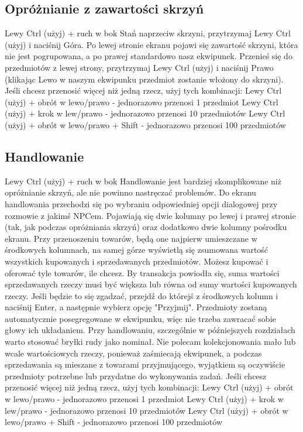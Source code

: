 \documentclass[11pt,polish, openany]{book}
\begin{document}
\subsection{Opróżnianie z zawartości skrzyń}
Lewy Ctrl (użyj) + ruch w bok
Stań naprzeciw skrzyni, przytrzymaj Lewy Ctrl (użyj) i naciśnij Góra. Po lewej stronie ekranu pojawi się zawartość skrzyni, która nie jest pogrupowana, a po prawej standardowo nasz ekwipunek. Przenieś się do przedmiotów z lewej strony, przytrzymaj Lewy Ctrl (użyj) i naciśnij Prawo (klikając Lewo w naszym ekwipunku przedmiot zostanie włożony do skrzyni).
Jeśli chcesz przenosić więcej niż jedną rzecz, użyj tych kombinacji:
Lewy Ctrl (użyj) + obrót w lewo/prawo - jednorazowo przenosi 1 przedmiot
Lewy Ctrl (użyj) + krok w lew/prawo - jednorazowo przenosi 10 przedmiotów
Lewy Ctrl (użyj) + obrót w lewo/prawo + Shift - jednorazowo przenosi 100 przedmiotów
\subsection{Handlowanie}
Lewy Ctrl (użyj) + ruch w bok
Handlowanie jest bardziej skomplikowane niż opróżnianie skrzyń, ale nie powinno nastręczać problemów. Do ekranu handlowania przechodzi się po wybraniu odpowiedniej opcji dialogowej przy rozmowie z jakimś NPCem. Pojawiają się dwie kolumny po lewej i prawej stronie (tak, jak podczas opróżniania skrzyń) oraz dodatkowo dwie kolumny pośrodku ekranu. Przy przenoszeniu towarów, będą one najpierw umieszczane w środkowych kolumnach, na samej górze wyświetlą się zsumowana wartość wszystkich kupowanych i sprzedawanych przedmiotów. Możesz kupować i oferować tyle towarów, ile chcesz. By transakcja powiodła się, suma wartości sprzedawanych rzeczy musi być większa lub równa od sumy wartości kupowanych rzeczy. Jeśli będzie to się zgadzać, przejdź do którejś z środkowych kolumn i naciśnij Enter, a następnie wybierz opcję "Przyjmij". Przedmioty zostaną automatycznie posegregowane w ekwipunku, więc nie trzeba zawracać sobie głowy ich układaniem. Przy handlowaniu, szczególnie w późniejszych rozdziałach warto stosować bryłki rudy jako nominał. Nie polecam kolekcjonowania mało lub wcale wartościowych rzeczy, ponieważ zaśmiecają ekwipunek, a podczas sprzedawania są mieszane z towarami przyjmującego, wyjątkiem są oczywiście przedmioty potrzebne lub przydatne do wykonywania zadań.
Jeśli chcesz przenosić więcej niż jedną rzecz, użyj tych kombinacji:
Lewy Ctrl (użyj) + obrót w lewo/prawo - jednorazowo przenosi 1 przedmiot
Lewy Ctrl (użyj) + krok w lew/prawo - jednorazowo przenosi 10 przedmiotów
Lewy Ctrl (użyj) + obrót w lewo/prawo + Shift - jednorazowo przenosi 100 przedmiotów
\end{document}
